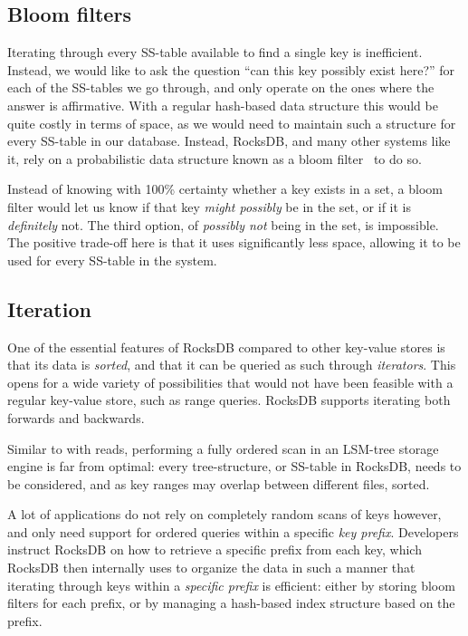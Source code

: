 \subsection{Bloom filters}\label{sec:bloom}

Iterating through every SS-table available to find a single key is inefficient.
Instead, we would like to ask the question ``can this key possibly exist here?''
for each of the SS-tables we go through, and only operate on the ones where the
answer is affirmative. With a regular hash-based data structure this would be
quite costly in terms of space, as we would need to maintain such a structure
for every SS-table in our database. Instead, RocksDB, and many other systems
like it, rely on a probabilistic data structure known as a bloom
filter~\cite{bloom} to do so.

Instead of knowing with 100\% certainty whether a key exists in a set, a bloom
filter would let us know if that key \textit{might possibly} be in the set, or
if it is \textit{definitely} not. The third option, of \textit{possibly not}
being in the set, is impossible. The positive trade-off here is that it uses
significantly less space, allowing it to be used for every SS-table in the
system.

\subsection{Iteration}
One of the essential features of RocksDB compared to other key-value stores is
that its data is \textit{sorted}, and that it can be queried as such through
\textit{iterators}. This opens for a wide variety of possibilities that would
not have been feasible with a regular key-value store, such as range queries.
RocksDB supports iterating both forwards and backwards.

Similar to with reads, performing a fully ordered scan in an LSM-tree storage
engine is far from optimal: every tree-structure, or SS-table in RocksDB, needs
to be considered, and as key ranges may overlap between different files, sorted.

A lot of applications do not rely on completely random scans of keys however,
and only need support for ordered queries within a specific \textit{key prefix}.
Developers instruct RocksDB on how to retrieve a specific prefix from each key,
which RocksDB then internally uses to organize the data in such a manner that
iterating through keys within a \textit{specific prefix} is efficient: either by
storing bloom filters for each prefix, or by managing a hash-based index
structure based on the prefix.

